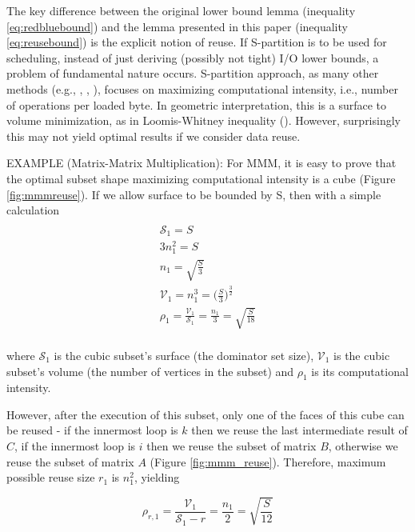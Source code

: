 \documentclass[sigconf]{acmart}
\begin{document}
The key difference between the original lower bound lemma (inequality 
\ref{eq:redbluebound}) and the lemma presented in this paper (inequality 
\ref{eq:reusebound}) is the explicit notion of reuse. 
If S-partition is to be used for scheduling, instead of just deriving 
(possibly not tight) I/O lower bounds, a problem of fundamental nature occurs.
S-partition approach, as many other methods (e.g., \cite{IronyMMM}, 
\cite{MMM_LW}, \cite{elangoSymbolic}), focuses on maximizing computational 
intensity, 
i.e., number of operations per loaded byte. In geometric interpretation, 
this is a surface to volume minimization, as in Loomis-Whitney inequality 
(\cite{loomisWhitney}). However, surprisingly this may not yield optimal 
results if we 
consider data reuse.

EXAMPLE (Matrix-Matrix Multiplication): For MMM, it is easy to prove that 
the optimal subset shape maximizing computational intensity is a cube 
(Figure \ref{fig:mmmreuse}). If we allow surface to be bounded by S, 
then 
with a simple calculation	
\begin{multline}
\label{eq:cubic}
\\
\mathcal{S}_1 = S \\
3 n_1^2 = S \\
n_1 = \sqrt{\frac{S}{3}} \\
\mathcal{V}_1 = n_1^3 = \Big(\frac{S}{3}\Big)^{\frac{3}{2}} \\
\rho_1 = \frac{\mathcal{V}_1}{\mathcal{S}_1} = \frac{n_1}{3} = 
\sqrt{\frac{S}{18}}\\
\end{multline}

where $\mathcal{S}_1$ is the cubic subset's surface (the dominator set 
size), 
$\mathcal{V}_1$ is the cubic subset's volume (the number of vertices in 
the 
subset) and $\rho_1$ is its computational intensity.

However, after the execution of this subset, only one of the faces of 
this cube can be reused - if the innermost loop is $k$ then we reuse the 
last intermediate result of $C$, if the innermost loop is $i$ then we reuse 
the subset of matrix $B$, otherwise we reuse the subset of matrix $A$ 
(Figure \ref{fig:mmm_reuse}). Therefore, maximum possible reuse size $r_1$ 
is 
$n_1^2$, yielding 

$$\rho_{r,1} = \frac{\mathcal{V}_1}{\mathcal{S}_1 - r} = \frac{n_1}{2} = 
\sqrt{\frac{S}{12}}$$
\end{document}
